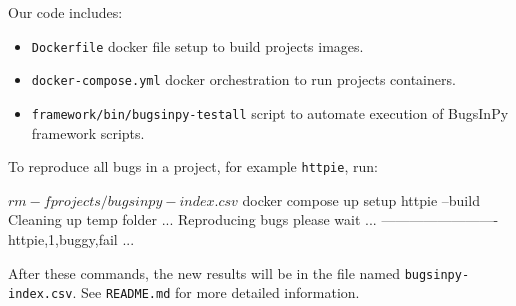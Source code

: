 \documentclass[conference]{IEEEtran}
\begin{document}
Our code includes:
\begin{itemize}
  \item \texttt{Dockerfile} docker file setup to build projects images.
  \item \texttt{docker-compose.yml} docker orchestration to run projects containers.
  \item \texttt{framework/bin/bugsinpy-testall} script to automate execution of BugsInPy framework scripts.
\end{itemize}

To reproduce all bugs in a project, for example \texttt{httpie}, run:

\begin{verbatim*}
$ rm -f projects/bugsinpy-index.csv
$ docker compose up setup httpie --build
Cleaning up temp folder ...
Reproducing bugs please wait ...
-------------------------
httpie,1,buggy,fail
...
\end{verbatim*}

After these commands, the new results will be in the file named \texttt{bugsinpy-index.csv}.
See \texttt{README.md} for more detailed information.
\end{document}
